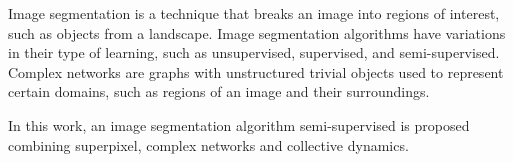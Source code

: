Image segmentation is a technique that breaks an image into regions of
interest, such as objects from a landscape. Image segmentation
algorithms have variations in their type of learning, such as
unsupervised, supervised, and semi-supervised. Complex networks are
graphs with unstructured trivial objects used to represent certain
domains, such as regions of an image and their surroundings.

In this work, an image segmentation algorithm
semi-supervised is proposed combining superpixel,
complex networks and collective dynamics.

